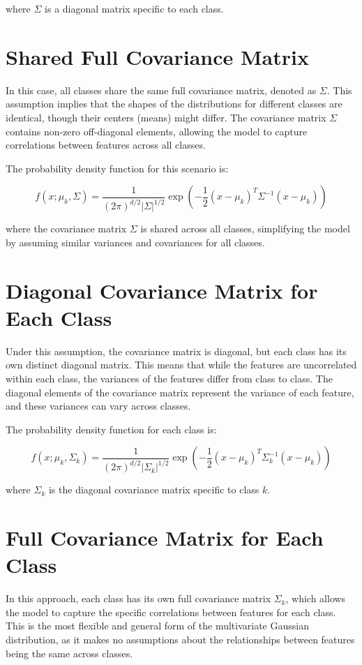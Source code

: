 \documentclass[conference]{IEEEtran}
\begin{document}
	where \( \Sigma \) is a diagonal matrix specific to each class.
	
	\section{Shared Full Covariance Matrix}
	In this case, all classes share the same full covariance matrix, denoted as \( \Sigma \). This assumption implies that the shapes of the distributions for different classes are identical, though their centers (means) might differ. The covariance matrix \( \Sigma \) contains non-zero off-diagonal elements, allowing the model to capture correlations between features across all classes.
	
	The probability density function for this scenario is:
	
	\[
	f(x; \mu_k, \Sigma) = \frac{1}{(2\pi)^{d/2} |\Sigma|^{1/2}} \exp\left(-\frac{1}{2} (x - \mu_k)^T \Sigma^{-1} (x - \mu_k)\right)
	\]
	
	where the covariance matrix \( \Sigma \) is shared across all classes, simplifying the model by assuming similar variances and covariances for all classes.
	
		\section{Diagonal Covariance Matrix for Each Class}
	Under this assumption, the covariance matrix is diagonal, but each class has its own distinct diagonal matrix. This means that while the features are uncorrelated within each class, the variances of the features differ from class to class. The diagonal elements of the covariance matrix represent the variance of each feature, and these variances can vary across classes.
	
	The probability density function for each class is:
	
	\[
	f(x; \mu_k, \Sigma_k) = \frac{1}{(2\pi)^{d/2} |\Sigma_k|^{1/2}} \exp\left(-\frac{1}{2} (x - \mu_k)^T \Sigma_k^{-1} (x - \mu_k)\right)
	\]
	
	where \( \Sigma_k \) is the diagonal covariance matrix specific to class \( k \).
	
	
	\section{Full Covariance Matrix for Each Class}
	In this approach, each class has its own full covariance matrix \( \Sigma_k \), which allows the model to capture the specific correlations between features for each class. This is the most flexible and general form of the multivariate Gaussian distribution, as it makes no assumptions about the relationships between features being the same across classes.
	
\end{document}
